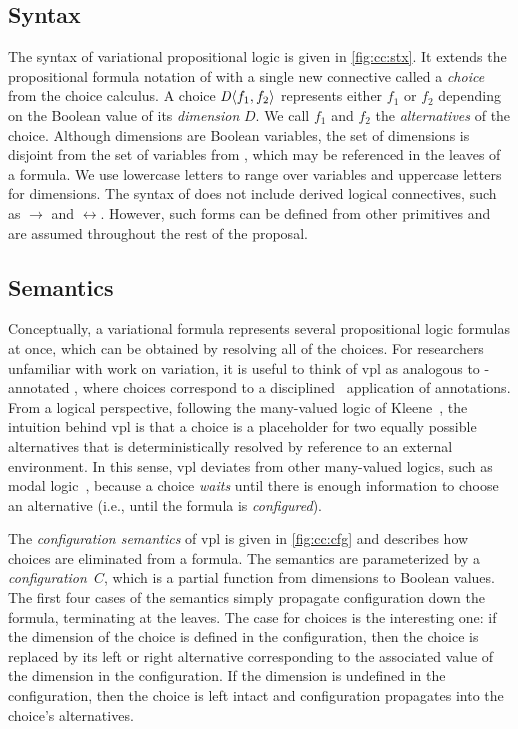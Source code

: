 \subsection{Syntax}
%
The syntax of variational propositional logic is given in \autoref{fig:cc:stx}.
It extends the propositional formula notation of \pl{} with a single new
connective called a \emph{choice} from the choice calculus.
%
A choice $\chc[D]{f_1,f_2}$ represents either $f_1$ or $f_2$ depending on the
Boolean value of its \emph{dimension} $D$. We call $f_1$ and $f_2$ the
\emph{alternatives} of the choice.
%
Although dimensions are Boolean variables, the set of dimensions is disjoint
from the set of variables from \pl{}, which may be referenced in the leaves of
a formula. We use lowercase letters to range over variables and uppercase
letters for dimensions.
%
The syntax of \vpl{} does not include derived logical connectives, such as
$\rightarrow$ and $\leftrightarrow$. However, such forms can be defined from
other primitives and are assumed throughout the rest of the proposal.

\subsection{Semantics}
%
Conceptually, a variational formula represents several propositional logic
formulas at once, which can be obtained by resolving all of the choices. For
researchers unfamiliar with work on variation, it is useful to think of \ac{vpl}
as analogous to -annotated \pl{}, where choices correspond to a
disciplined~\cite{LKA:AOSD11} application of  annotations.
%
From a logical perspective, following the many-valued logic of
Kleene~\cite{Rescher1969-RESML}, the intuition behind \ac{vpl} is that a choice is
a placeholder for two equally possible alternatives that is deterministically
resolved by reference to an external environment.
%
In this sense, \ac{vpl} deviates from other many-valued logics, such as modal
logic~\cite{sep-logic-modal}, because a choice \emph{waits} until there is
enough information to choose an alternative (i.e., until the formula is
\emph{configured}).

The \emph{configuration semantics} of \ac{vpl} is given in \autoref{fig:cc:cfg}
and describes how choices are eliminated from a formula. The semantics are
parameterized by a \emph{configuration}\ $C$, which is a partial function from
dimensions to Boolean values.
%
The first four cases of the semantics simply propagate configuration down the
formula, terminating at the leaves. The case for choices is the interesting one:
if the dimension of the choice is defined in the configuration, then the choice
is replaced by its left or right alternative corresponding to the associated
value of the dimension in the configuration. If the dimension is undefined in
the configuration, then the choice is left intact and configuration propagates
into the choice's alternatives.



